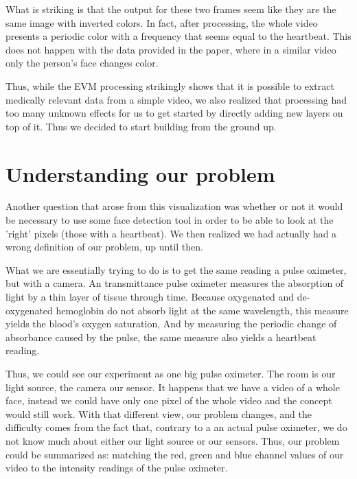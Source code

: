 \documentclass[12pt]{article}
\begin{document}
  What is striking is that the output for these two frames seem like they are the same image with inverted colors. In fact, after processing, the whole video presents a 
  periodic color with a frequency that seems equal to the heartbeat. This does not happen with the data provided in the paper, where in a similar video only the person's face 
  changes color.

  Thus, while the EVM processing strikingly shows that it is possible to extract medically relevant data from a simple video, we also realized that processing had too many 
  unknown effects for us to get started by directly adding new layers on top of it. Thus we decided to start building from the ground up.

  \section{Understanding our problem}

  Another question that arose from this visualization was whether or not it would be necessary to use some face detection tool 
  in order to be able to look at the 'right' pixels (those with a heartbeat). We then realized we had actually 
  had a wrong definition of our problem, up until then.

  What we are essentially trying to do is to get the same reading a pulse oximeter, but with a camera.
  An transmittance pulse oximeter measures the absorption of light by a thin layer of 
  tissue through time. Because oxygenated and de-oxygenated hemoglobin do not absorb light 
  at the same wavelength, this measure yields the blood's oxygen saturation, And by measuring the 
  periodic change of absorbance caused by the pulse, the same measure also yields a heartbeat reading.

  Thus, we could see our experiment as one big pulse oximeter. The room is our light source, 
  the camera our sensor. It happens that we have a video of a whole face, instead we could 
  have only one pixel of the whole video and the concept would still work. 
  With that different view, our problem changes, and the difficulty comes from the 
  fact that, contrary to a an actual pulse oximeter, we do not know much about either our light source or our sensors.
  Thus, our problem could be summarized as: matching the red, green and blue channel values of our video to 
  the intensity readings of the pulse oximeter.
\end{document}
